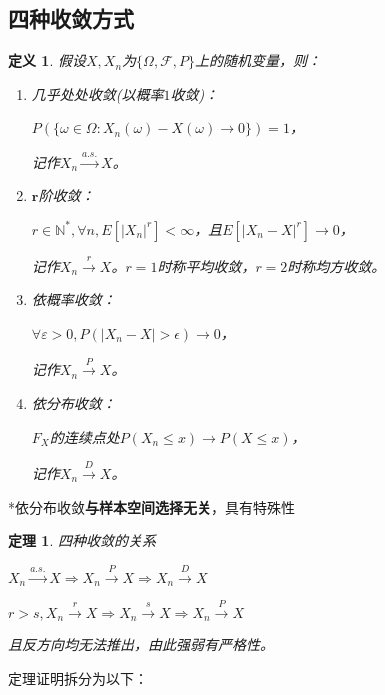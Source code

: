 \documentclass[a4paper,UTF8,fontset=windows]{ctexart}
\newtheorem{thm}{定理}[section]
\newtheorem{defi}{定义}[section]
\newcommand{\con}[1]{\stackrel{#1}{\longrightarrow}}
\begin{document}
\subsection{四种收敛方式}
\begin{defi} 假设$X,X_n$为$\{\Omega,\mathcal{F},P\}$上的随机变量，则：
\begin{enumerate}
	\item \emph{几乎处处收敛}(以概率$1$收敛)：
	
	$P(\{\omega\in\Omega:X_n(\omega)-X(\omega)\con{}0\})=1$，
	
	记作$X_n\con{a.s.}X$。
	
	\item $\mathbf{r}$\emph{阶收敛}：
	
	$r\in\mathbb{N}^*,\forall n,E[|X_n|^r]<\infty$，且$E[|X_n-X|^r]\con{}0$，
	
	记作$X_n\con{r}X$。$r=1$时称\emph{平均收敛}，$r=2$时称\emph{均方收敛}。
	
	\item \emph{依概率收敛}：
	
	$\forall\varepsilon>0,P(|X_n-X|>\epsilon)\con{}0$，
	
	记作$X_n\con{P}X$。
	
	\item \emph{依分布收敛}：
	
	$F_X$的连续点处$P(X_n\le x)\con{}P(X\le x)$，
	
	记作$X_n\con{D}X$。
\end{enumerate}
\end{defi}

*依分布收敛\textbf{与样本空间选择无关}，具有特殊性

\begin{thm} 四种收敛的关系

$X_n\con{a.s.}X\Rightarrow X_n\con{P}X\Rightarrow X_n\con{D}X$

$r>s,X_n\con{r}X\Rightarrow X_n\con{s}X\Rightarrow X_n\con{P}X$

且反方向均无法推出，由此强弱有\emph{严格性}。
\end{thm}

定理证明拆分为以下：
\end{document}
